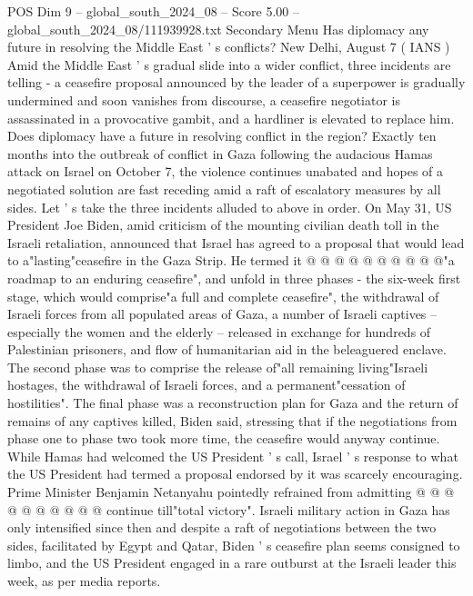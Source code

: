 \begin{textsample}{POS Dim 9 – global\_south\_2024\_08 – Score 5.00 – global\_south\_2024\_08/111939928.txt}  \label{ex:f9_pos_114}
Secondary Menu Has diplomacy any future in resolving the Middle East ' s conflicts?
New Delhi, August 7 ( IANS ) Amid the Middle East ' s gradual slide into a wider conflict, three incidents are telling - a ceasefire proposal announced by the leader of a superpower is gradually undermined and soon vanishes from discourse, a ceasefire negotiator is assassinated in a provocative gambit, and a hardliner is elevated to replace him.
Does diplomacy have a future in resolving conflict in the region?
Exactly ten months into the outbreak of conflict in Gaza following the audacious Hamas attack on Israel on October 7, the violence continues unabated and hopes of a negotiated solution are fast receding amid a raft of escalatory measures by all sides.
Let ' s take the three incidents alluded to above in order.
On May 31, US President Joe Biden, amid criticism of the mounting civilian death toll in the Israeli retaliation, announced that Israel has agreed to a proposal that would lead to a"lasting"ceasefire in the Gaza Strip.
He termed it @ @ @ @ @ @ @ @ @ @"a roadmap to an enduring ceasefire", and unfold in three phases - the six-week first stage, which would comprise"a full and complete ceasefire", the withdrawal of Israeli forces from all populated areas of Gaza, a number of Israeli captives -- especially the women and the elderly -- released in exchange for hundreds of Palestinian prisoners, and flow of humanitarian aid in the beleaguered enclave.
The second phase was to comprise the release of"all remaining living"Israeli hostages, the withdrawal of Israeli forces, and a permanent"cessation of hostilities".
The final phase was a reconstruction plan for Gaza and the return of remains of any captives killed, Biden said, stressing that if the negotiations from phase one to phase two took more time, the ceasefire would anyway continue.
While Hamas had welcomed the US President ' s call, Israel ' s response to what the US President had termed a proposal endorsed by it was scarcely encouraging.
Prime Minister Benjamin Netanyahu pointedly refrained from admitting @ @ @ @ @ @ @ @ @ @ continue till"total victory".
Israeli military action in Gaza has only intensified since then and despite a raft of negotiations between the two sides, facilitated by Egypt and Qatar, Biden ' s ceasefire plan seems consigned to limbo, and the US President engaged in a rare outburst at the Israeli leader this week, as per media reports.

\end{textsample}
